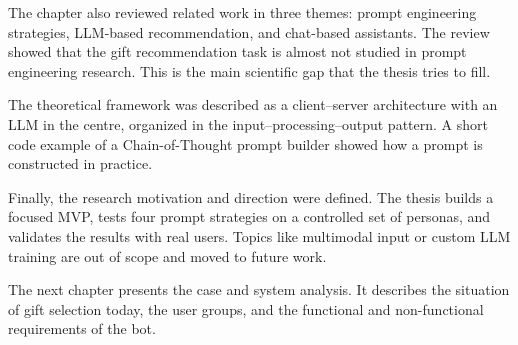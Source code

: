 The chapter also reviewed related work in three themes: prompt engineering strategies, LLM-based recommendation, and chat-based assistants. The review showed that the gift recommendation task is almost not studied in prompt engineering research. This is the main scientific gap that the thesis tries to fill.

The theoretical framework was described as a client--server architecture with an LLM in the centre, organized in the input--processing--output pattern. A short code example of a Chain-of-Thought prompt builder showed how a prompt is constructed in practice.

Finally, the research motivation and direction were defined. The thesis builds a focused MVP, tests four prompt strategies on a controlled set of personas, and validates the results with real users. Topics like multimodal input or custom LLM training are out of scope and moved to future work.

The next chapter presents the case and system analysis. It describes the situation of gift selection today, the user groups, and the functional and non-functional requirements of the bot.
